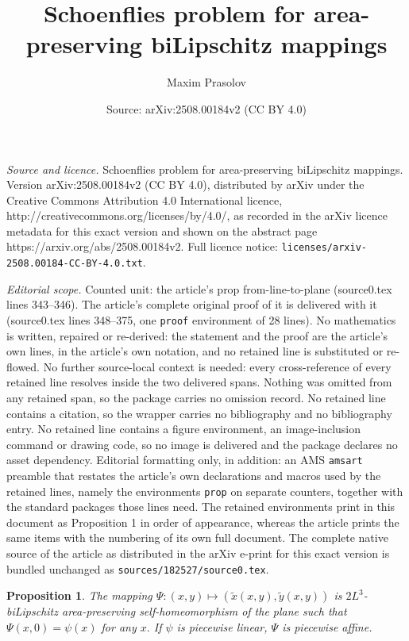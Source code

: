 \documentclass[10pt,a4paper]{amsart}
\title{Schoenflies problem for area-preserving biLipschitz mappings}
\author{Maxim Prasolov}
\date{Source: arXiv:2508.00184v2 (CC BY 4.0)}
\newtheorem{prop}{Proposition}
\begin{document}
\maketitle

\noindent\emph{Source and licence.} Schoenflies problem for area-preserving biLipschitz mappings. Version arXiv:2508.00184v2 (CC BY 4.0), distributed by arXiv under the Creative Commons Attribution 4.0 International licence, http://creativecommons.org/licenses/by/4.0/, as recorded in the arXiv licence metadata for this exact version and shown on the abstract page https://arxiv.org/abs/2508.00184v2. Full licence notice: \texttt{licenses/arxiv-2508.00184-CC-BY-4.0.txt}.\par\smallskip

\noindent\textit{Editorial scope.} Counted unit: the article's prop from-line-to-plane (source0.tex lines 343--346). The article's complete original proof of it is delivered with it (source0.tex lines 348--375, one \texttt{proof} environment of 28 lines). No mathematics is written, repaired or re-derived: the statement and the proof are the article's own lines, in the article's own notation, and no retained line is substituted or re-flowed.  No further source-local context is needed: every cross-reference of every retained line resolves inside the two delivered spans.  Nothing was omitted from any retained span, so the package carries no omission record.  No retained line contains a citation, so the wrapper carries no bibliography and no bibliography entry.  No retained line contains a figure environment, an image-inclusion command or drawing code, so no image is delivered and the package declares no asset dependency.  Editorial formatting only, in addition: an AMS \texttt{amsart} preamble that restates the article's own declarations and macros used by the retained lines, namely the environments \texttt{prop} on separate counters, together with the standard packages those lines need.  The retained environments print in this document as Proposition 1 in order of appearance, whereas the article prints the same items with the numbering of its own full document.  The complete native source of the article as distributed in the arXiv e-print for this exact version is bundled unchanged as \texttt{sources/182527/source0.tex}.
\begin{prop}
\label{from-line-to-plane}
The mapping $\Psi:(x, y)\mapsto (\widetilde x(x, y), \widetilde y(x, y))$ is $2L^3$-biLipschitz area-preserving self-homeomorphism of the plane such that $\Psi(x, 0) = \psi(x)$ for any $x.$ If $\psi$ is piecewise linear, $\Psi$ is piecewise affine.
\end{prop}
\end{document}
